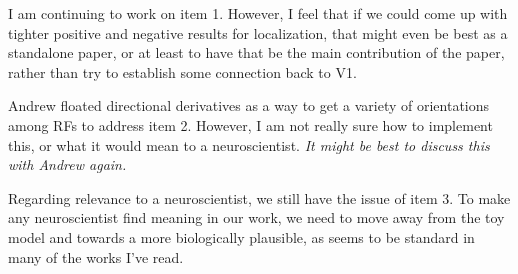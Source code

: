 I am continuing to work on item 1.
However, I feel that if we could come up with tighter positive and negative results for localization, that might even be best as a standalone paper, or at least to have that be the main contribution of the paper, rather than try to establish some connection back to V1.

Andrew floated directional derivatives as a way to get a variety of orientations among RFs to address item 2.
However, I am not really sure how to implement this, or what it would mean to a neuroscientist.
\emph{It might be best to discuss this with Andrew again.}

Regarding relevance to a neuroscientist, we still have the issue of item 3.
To make any neuroscientist find meaning in our work, we need to move away from the toy model and towards a more biologically plausible, as seems to be standard in many of the works I've read.

